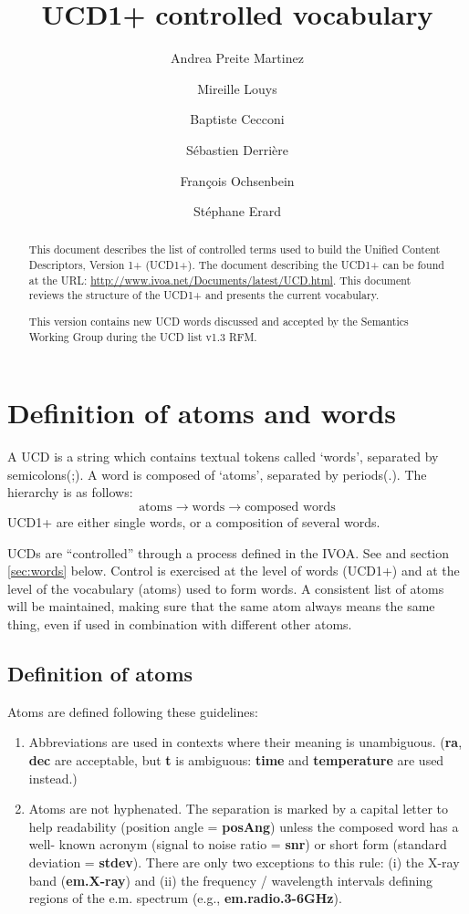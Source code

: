 \documentclass[11pt,a4paper]{ivoa}
\title{UCD1+ controlled vocabulary}
\author{Andrea Preite Martinez}
\author{Mireille Louys}
\author{Baptiste Cecconi}
\author{S\'ebastien Derri\`ere}
\author{Fran\c cois Ochsenbein}
\author{St\'ephane Erard}
\begin{document}
\begin{abstract}
This document describes the list of controlled terms used to build the Unified Content Descriptors, Version 1+ (UCD1+). 
The document describing the UCD1+ can be found at the URL: \url{http://www.ivoa.net/Documents/latest/UCD.html}. This 
document reviews the structure of the UCD1+ and presents the current vocabulary.  

This version contains new UCD words discussed and accepted by the Semantics Working Group during the UCD list v1.3 RFM.

\end{abstract} 

\section{Definition of atoms and words}
A UCD is a string which contains textual tokens called `words', separated by semicolons(;). A word is composed of 
`atoms', separated by periods(.). The hierarchy is as follows: 
$$
\textrm{atoms} \rightarrow \textrm{words} \rightarrow \textrm{composed words}
$$
UCD1+ are either single words, or a composition of several words.

UCDs are ``controlled'' through a process defined in the IVOA. See \citet{std:UCD} and section \ref{sec:words} below. 
Control is exercised at the level of words (UCD1+) and at the level of the vocabulary (atoms) used to form words. A 
consistent list of atoms will be maintained, making sure that the same atom always means the same thing, even if used 
in combination with different other atoms. 

\subsection{Definition of atoms}
Atoms are defined following these guidelines:
\begin{enumerate}
\item Abbreviations are used in contexts where their meaning is unambiguous. ({\bf ra}, {\bf dec} are 
acceptable, but {\bf t} is ambiguous: {\bf time} and {\bf temperature} are used instead.)
\item Atoms are not hyphenated. The separation is marked by a capital letter to help readability 
(position angle = {\bf posAng}) unless the composed word has a well- known acronym (signal to noise ratio = 
{\bf snr}) or short form (standard deviation = {\bf stdev}). There are only two exceptions to this rule: 
(i) the X-ray band ({\bf em.X-ray}) and (ii) the frequency / wavelength intervals defining regions of the 
e.m. spectrum (e.g., {\bf em.radio.3-6GHz}).
\end{enumerate}
\end{document}
